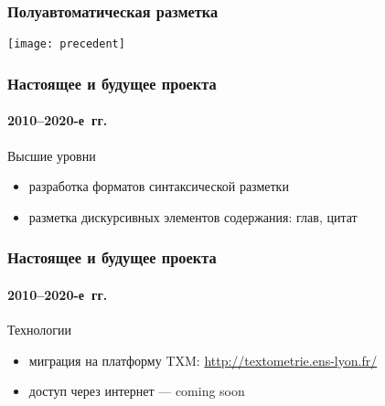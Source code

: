 \begin{frame}
  \frametitle{Полуавтоматическая разметка}

  \begin{center}
    \texttt{[image: precedent]}
  \end{center}
\end{frame}

\begin{frame}
  \frametitle{Настоящее и будущее проекта}
  \framesubtitle{2010--2020-е~гг.}

  \begin{block}{Высшие уровни}
    \begin{itemize}
      \item разработка форматов синтаксической разметки\autocite{gorlov:2018}
      \item разметка дискурсивных элементов содержания: глав\autocite{rogozina:2015}, цитат\autocite{alexeeva:2019}
    \end{itemize}
  \end{block}
\end{frame}

\begin{frame}
  \frametitle{Настоящее и будущее проекта}
  \framesubtitle{2010--2020-е~гг.}

  \begin{block}{Технологии}
    \begin{itemize}
      \item миграция на платформу TXM: \url{http://textometrie.ens-lyon.fr/}
      \item доступ через интернет --- \foreignlanguage{english}{coming soon}
    \end{itemize}
  \end{block}
\end{frame}
